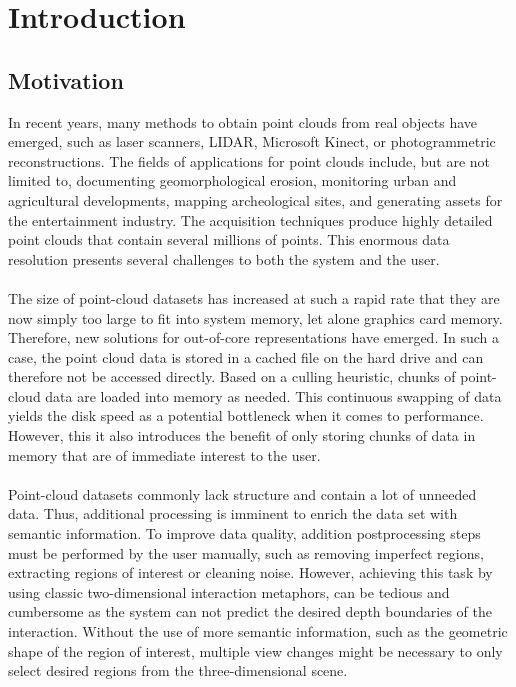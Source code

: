 \chapter{Introduction}
\section{Motivation}

In recent years, many methods to obtain point clouds from real objects have emerged, such as laser scanners, LIDAR, Microsoft Kinect, or photogrammetric reconstructions. The fields of applications for point clouds include, but are not limited to, documenting geomorphological erosion, monitoring urban and agricultural developments, mapping archeological sites, and generating assets for the entertainment industry. The acquisition techniques produce highly detailed point clouds that contain several millions of points. This enormous data resolution presents several challenges to both the system and the user. 
\\
\\
The size of point-cloud datasets has increased at such a rapid rate that they are now simply too large to fit into system memory, let alone graphics card memory. Therefore, new solutions for out-of-core representations have emerged. In such a case, the point cloud data is stored in a cached file on the hard drive and can therefore not be accessed directly. Based on a culling heuristic, chunks of point-cloud data are loaded into memory as needed. This continuous swapping of data yields the disk speed as a potential bottleneck when it comes to performance. However, this it also introduces the benefit of only storing chunks of data in memory that are of immediate interest to the user. 
\\
\\
Point-cloud datasets commonly lack structure and contain a lot of unneeded data. Thus, additional processing is imminent to enrich the data set with semantic information. To improve data quality, addition postprocessing steps must be performed by the user manually, such as removing imperfect regions, extracting regions of interest or cleaning noise. However, achieving this task by using classic two-dimensional interaction metaphors, can be tedious and cumbersome as the system can not predict the desired depth boundaries of the interaction. Without the use of more semantic information, such as the geometric shape of the region of interest, multiple view changes might be necessary to only select desired regions from the three-dimensional scene. 
